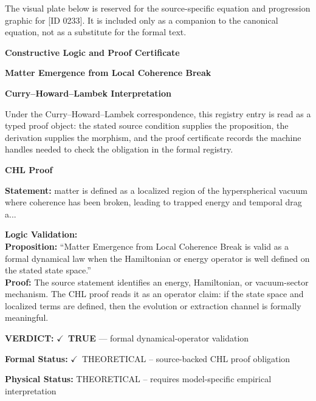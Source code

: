 \begingroup\footnotesize\sloppy
The visual plate below is reserved for the source-specific equation and progression graphic for [ID 0233]. It is included only as a companion to the canonical equation, not as a substitute for the formal text.
\par\endgroup
\ifTZPDarkEdition
{}
\fi

\clearpage
\begingroup\tzpsupportsetup
\noindent\textbf{\fontsize{10.8pt}{12.8pt}\selectfont [ID 0233] Constructive Logic and Proof Certificate}\par
\noindent\textbf{\fontsize{10pt}{12pt}\selectfont Matter Emergence from Local Coherence Break}\par
\vspace{0.45em}
\begingroup
\footnotesize
\setlength{\parskip}{0.22em}
\setlength{\parindent}{0pt}
\noindent\textbf{Curry--Howard--Lambek Interpretation}\par
Under the Curry--Howard--Lambek correspondence, this registry entry is read as a typed proof
object: the stated source condition supplies the proposition, the derivation supplies the
morphism, and the proof certificate records the machine handles needed to check the obligation
in the formal registry.

\vspace{0.45em}
\noindent\textbf{CHL Proof}\par
\textbf{Statement:} matter is defined as a localized region of the hyperspherical vacuum where coherence has
been broken, leading to trapped energy and temporal drag a...

\textbf{Logic Validation:}\\
\textbf{Proposition:} ``Matter Emergence from Local Coherence Break is valid as a formal dynamical law when the
Hamiltonian or energy operator is well defined on the stated state space.''\\
\textbf{Proof:} The source statement identifies an energy, Hamiltonian, or vacuum-sector mechanism. The
CHL proof reads it as an operator claim: if the state space and localized terms are
defined, then the evolution or extraction channel is formally meaningful.

\textbf{VERDICT:} \ensuremath{\checkmark}\ \textbf{TRUE} --- formal dynamical-operator validation

\textbf{Formal Status:} \ensuremath{\checkmark}\ THEORETICAL -- source-backed CHL proof obligation

\textbf{Physical Status:} THEORETICAL -- requires model-specific empirical interpretation
\par\vspace{0.45em}
\par
\ifTZPDarkEdition
{}
\fi
\endgroup
\endgroup
